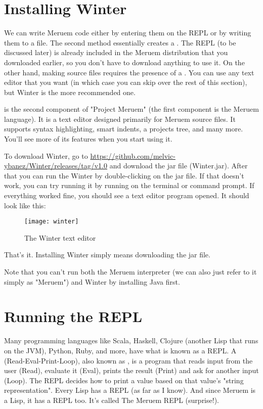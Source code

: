 \section{Installing Winter}
We can write Meruem code either by entering them on the REPL or by writing them to a file. The second method essentially creates a . The REPL (to be discussed later) is already included in the Meruem distribution that you downloaded earlier, so you don't have to download anything to use it. On the other hand, making source files requires the presence of a . You can use any text editor that you want (in which case you can skip over the rest of this section), but Winter is the more recommended one. 

 is the second component of "Project Meruem" (the first component is the Meruem language). It is a text editor designed primarily for Meruem source files. It supports syntax highlighting, smart indents, a projects tree, and many more. You'll see more of its features when you start using it.

To download Winter, go to \url{https://github.com/melvic-ybanez/Winter/releases/tag/v1.0} and download the jar file (Winter.jar). After that you can run the Winter by double-clicking on the jar file. If that doesn't work, you can try running it by running  on the terminal or command prompt. If everything worked fine, you should see a text editor program opened. It should look like this:

\begin{figure}[H]
\texttt{[image: winter]}
\caption{The Winter text editor}
\centering
\end{figure}

That's it. Installing Winter simply means downloading the jar file.

Note that you can't run both the Meruem interpreter (we can also just refer to it simply as "Meruem") and Winter by installing Java first.

\section{Running the REPL}
Many programming languages like Scala, Haskell, Clojure (another Lisp that runs on the JVM), Python, Ruby, and more, have what is known as a REPL. A  (Read-Eval-Print-Loop), also known as , is a program that reads input from the user (Read), evaluate it (Eval), prints the result (Print) and ask for another input (Loop). The REPL decides how to print a value based on that value's "string representation". Every Lisp has a REPL (as far as I know). And since Meruem is a Lisp, it has a REPL too. It's called The Meruem REPL (surprise!). 

